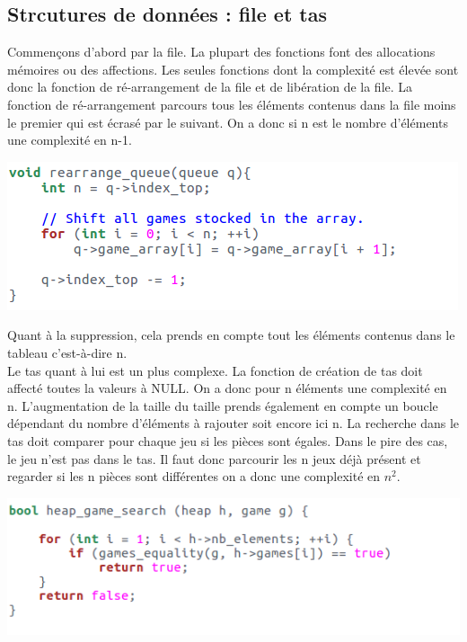 \documentclass{article}
\begin{document}
\subsection{Strcutures de données : file et tas}

Commençons d'abord par la file. La plupart des fonctions font des allocations mémoires ou des affections. Les seules fonctions dont la complexité est élevée sont donc la fonction de ré-arrangement de la file et de libération de la file. La fonction de ré-arrangement parcours tous les éléments contenus dans la file moins le premier qui est écrasé par le suivant. On a donc si n est le nombre d'éléments une complexité en n-1.


\begin{flushleft}
\includegraphics[scale=0.45]{triqueue.png}
\end{flushleft}

Quant à la suppression, cela prends en compte tout les éléments contenus dans le tableau c'est-à-dire n.\\

Le tas quant à lui est un plus complexe. La fonction de création de tas doit affecté toutes la valeurs à NULL. On a donc pour n éléments une complexité en n. L'augmentation de la taille du taille prends également en compte un boucle dépendant du nombre d'éléments à rajouter soit encore ici n. 
La recherche dans le tas doit comparer pour chaque jeu si les pièces sont égales. Dans le pire des cas, le jeu n'est pas dans le tas. Il faut donc parcourir les n jeux déjà présent et regarder si les n pièces sont différentes on a donc une complexité en $n^{2}$.

\begin{flushleft}
\includegraphics[scale=0.45]{recherchetas.png}
\end{flushleft}
\end{document}

